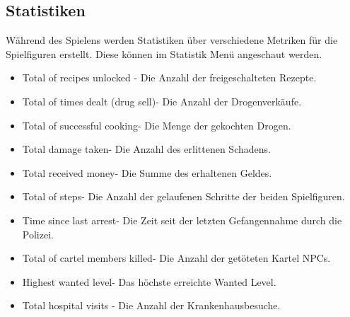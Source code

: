 \subsection{Statistiken}\label{subsec:statistiken}

\noindent Während des Spielens werden Statistiken über verschiedene Metriken für die Spielfiguren erstellt. Diese können im Statistik Menü angeschaut werden.

\vspace{1cm}

\begin{itemize}
    \item Total of recipes unlocked \newline - Die Anzahl der freigeschalteten Rezepte.
    \item Total of times dealt (drug sell)\newline - Die Anzahl der Drogenverkäufe.
    \item Total of successful cooking\newline - Die Menge der gekochten Drogen.
    \item Total damage taken\newline - Die Anzahl des erlittenen Schadens.
    \item Total received money\newline - Die Summe des erhaltenen Geldes.
    \item Total of steps\newline - Die Anzahl der gelaufenen Schritte der beiden Spielfiguren.
    \item Time since last arrest\newline - Die Zeit seit der letzten Gefangennahme durch die Polizei.
    \item Total of cartel members killed\newline - Die Anzahl der getöteten Kartel NPCs.
    \item Highest wanted level\newline - Das höchste erreichte Wanted Level.
    \item Total hospital visits \newline - Die Anzahl der Krankenhausbesuche.
\end{itemize}